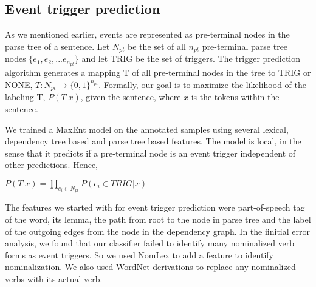 \subsection{Event trigger prediction}
As we mentioned earlier, events are represented as pre-terminal nodes in the parse tree of a sentence. Let $N_{pt}$ be the set of all $n_{pt}$ pre-terminal parse tree nodes $\{e_1, e_2, ... e_{n_{pt}}\}$ and let TRIG be the set of triggers. The trigger prediction algorithm generates a mapping T of all pre-terminal nodes in the tree to TRIG or NONE, $T : N_{pt} \rightarrow \{0,1\}^{n_{pt}}$. Formally, our goal is to maximize the likelihood of the labeling T,  $P(T | x)$, given the sentence, where $x$ is the tokens within the sentence.

We trained a MaxEnt model on the annotated samples using several lexical, dependency tree based and parse tree based features. The model is local, in the sense that it predicts if a pre-terminal node is an event trigger independent of other predictions. Hence, 

$P(T | x) = \prod_{e_{i}\in N_{pt}} P(e_{i} \in TRIG | x) $

The features we started with for event trigger prediction were part-of-speech tag of the word, its lemma, the path from root to the node in parse tree and the label of the outgoing edges from the node in the dependency graph. In the iinitial error analysis, we found that our classifier failed to identify many nominalized verb forms as event triggers. So we used NomLex to add a feature to identify nominalization. We also used WordNet derivations to replace any nominalized verbs with its actual verb.